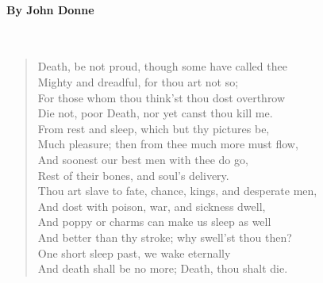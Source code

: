 \documentclass[12pt, openany, letterpaper]{memoir}
\begin{document}
\paragraph{By John Donne}~
\begin{verse}
	Death, be not proud, though some have called thee\\
	Mighty and dreadful, for thou art not so;\\
	For those whom thou think'st thou dost overthrow\\
	Die not, poor Death, nor yet canst thou kill me.\\
	From rest and sleep, which but thy pictures be,\\
	Much pleasure; then from thee much more must flow,\\
	And soonest our best men with thee do go,\\
	Rest of their bones, and soul's delivery.\\
	Thou art slave to fate, chance, kings, and desperate men,\\
	And dost with poison, war, and sickness dwell,\\
	And poppy or charms can make us sleep as well\\
	And better than thy stroke; why swell'st thou then?\\
	One short sleep past, we wake eternally\\
	And death shall be no more; Death, thou shalt die.
\end{verse}
\end{document}

